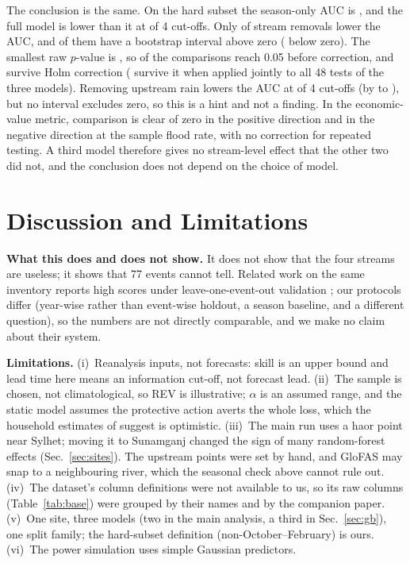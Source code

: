 The conclusion is the same. On the hard subset the season-only AUC is \gbSeasonHard, and the full model is lower than it at \gbFullBelow{} of 4 cut-offs. Only \gbPos{} of \gbNCells{} stream removals lower the AUC, and \gbSigPos{} of them have a bootstrap interval above zero (\gbSigNeg{} below zero). The smallest raw $p$-value is \gbMinP, so \gbRawSig{} of the \gbNCells{} comparisons reach 0.05 before correction, and \gbHolmSixteen{} survive Holm correction (\gbHolmJoint{} survive it when applied jointly to all 48 tests of the three models). Removing upstream rain lowers the AUC at \gbStwoPos{} of 4 cut-offs (by \gbStwoLo{} to \gbStwoHi), but no interval excludes zero, so this is a hint and not a finding. In the economic-value metric, \gbRevPos{} comparison is clear of zero in the positive direction and \gbRevNeg{} in the negative direction at the sample flood rate, with no correction for repeated testing. A third model therefore gives no stream-level effect that the other two did not, and the conclusion does not depend on the choice of model.

\begin{table}[t]
\centering\caption{Gradient boosting on the hard subset (leave-one-year-out). $^{*}$: 95\% year-cluster bootstrap interval excludes zero. The settings were not tuned.}\label{tab:gb}
\small{}
\end{table}

\section{Discussion and Limitations}
\textbf{What this does and does not show.} It does not show that the four streams are useless; it shows that 77 events cannot tell. Related work on the same inventory reports high scores under leave-one-event-out validation \cite{koli2026haorfloodalert}; our protocols differ (year-wise rather than event-wise holdout, a season baseline, and a different question), so the numbers are not directly comparable, and we make no claim about their system.

\textbf{Limitations.}
(i)~Reanalysis inputs, not forecasts: skill is an upper bound and lead time here means an information cut-off, not forecast lead.
(ii)~The sample is chosen, not climatological, so REV is illustrative; $\alpha$ is an assumed range, and the static model assumes the protective action averts the whole loss, which the household estimates of \cite{zayed2025} suggest is optimistic.
(iii)~The main run uses a haor point near Sylhet; moving it to Sunamganj changed the sign of many random-forest effects (Sec.~\ref{sec:sites}). The upstream points were set by hand, and GloFAS may snap to a neighbouring river, which the seasonal check above cannot rule out.
(iv)~The dataset's column definitions were not available to us, so its raw columns (Table~\ref{tab:base}) were grouped by their names and by the companion paper.
(v)~One site, three models (two in the main analysis, a third in Sec.~\ref{sec:gb}), one split family; the hard-subset definition (non-October--February) is ours.
(vi)~The power simulation uses simple Gaussian predictors.

